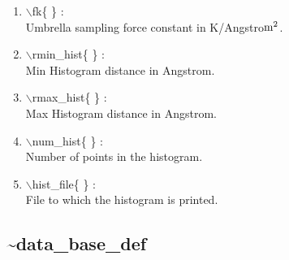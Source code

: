 \documentclass[12pt]{article}
\begin{document}
\begin{enumerate}
 \vspace{0.15in} 
 \item  $\backslash$fk\{ \} : \\               
    Umbrella sampling force constant in K/Angstro${\rm m}^2$.

 \vspace{0.15in} 
 \item  $\backslash$rmin\_hist\{ \} : \\         
    Min Histogram distance in Angstrom.

 \vspace{0.15in} 
 \item  $\backslash$rmax\_hist\{ \} : \\         
    Max Histogram distance in Angstrom.

 \vspace{0.15in} 
 \item  $\backslash$num\_hist\{ \} : \\         
    Number of points in the histogram.
 
 \vspace{0.15in} 
 \item  $\backslash$hist\_file\{ \} : \\        
    File to which the histogram is printed.

\end{enumerate}

\newpage
\subsection*{\bf \~{}data\_base\_def}
\end{document}
